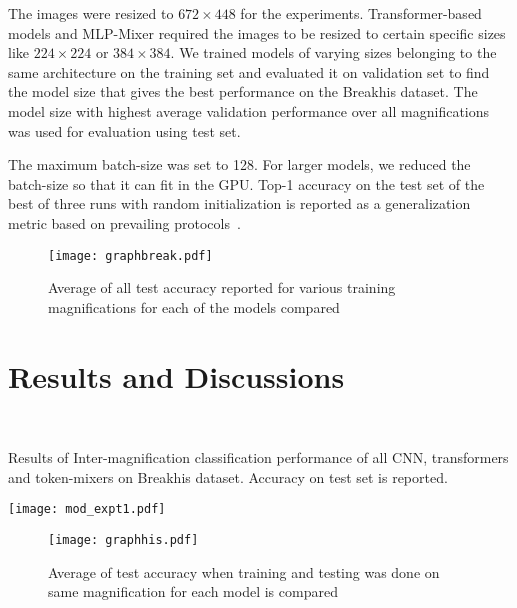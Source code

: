 \documentclass[nohyperref]{article}
\theoremstyle{plain}
\theoremstyle{definition}
\theoremstyle{remark}
\begin{document}
The images were resized to $672\times448$ for the experiments. Transformer-based models and MLP-Mixer required the images to be resized to certain specific sizes like $224\times224$ or $384\times384$. We trained models of varying sizes belonging to the same architecture on the training set and evaluated it on validation set to find the model size that gives the best performance on the Breakhis \cite{spanhol2015dataset} dataset. The model size with highest average validation performance over all magnifications was used for evaluation using test set.

The maximum batch-size was set to 128. For larger models, we reduced the batch-size so that it can fit in the GPU. Top-1 accuracy on the test set of the best of three runs with random initialization is reported as a generalization metric based on prevailing protocols~\cite{hassani2021escaping}. 

\begin{figure}[ht]
\vskip 0.2in
\begin{center}
\texttt{[image: graphbreak.pdf]}
\caption{Average of all test accuracy reported for various training magnifications for each of the models compared}
\label{fig:test}
\end{center}
\vskip -0.2in
\end{figure}

\section{Results and Discussions}



\
\begin{table*}[]
\centering
\caption{Results of Inter-magnification classification performance of all CNN, transformers and token-mixers on Breakhis \cite{spanhol2015dataset} dataset. Accuracy on test set is reported.}
\vspace{0.5 cm}
\centering

\texttt{[image: mod\_expt1.pdf]}
\label{tab:result}
\end{table*}

\begin{figure}[ht]
\vskip 0.2in
\begin{center}
\texttt{[image: graphhis.pdf]}
\caption{Average of test accuracy when training and testing was done on same magnification for each model is compared}
\label{fig:diag}
\end{center}
\vskip -0.2in
\end{figure}
\end{document}
